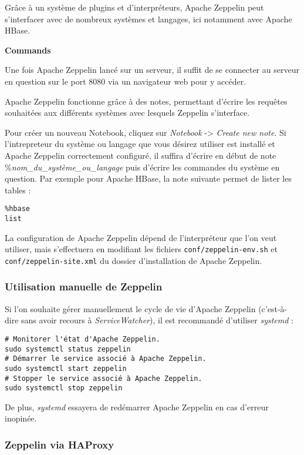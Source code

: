 \documentclass[a4paper,oneside,12pt]{article}
\begin{document}
Grâce à un système de plugins et d'interpréteurs, Apache Zeppelin peut 
s'interfacer avec de nombreux systèmes et langages, ici notamment avec 
Apache HBase.

\textbf{Commands}

Une fois Apache Zeppelin lancé sur un serveur, il suffit de se connecter 
au serveur en question sur le port 8080 via un navigateur web pour y accéder.

Apache Zeppelin fonctionne grâce à des notes, permettant d'écrire les 
requêtes souhaitées aux différents systèmes avec lesquels Zeppelin
s'interface.

Pour créer un nouveau Notebook, cliquez sur \textit{Notebook} -> \textit{Create new note}.
Si l'intrepreteur du système ou langage que vous désirez utiliser est installé
et Apache Zeppelin correctement configuré, il suffira d'écrire en début de note
\%\textit{nom\_du\_système\_ou\_langage} puis d'écrire les commandes du système en question.
Par exemple pour Apache HBase, la note suivante permet de lister les tables :  
\begin{verbatim}
%hbase  
list
\end{verbatim}

La configuration de Apache Zeppelin dépend de l'interpréteur que l'on veut utiliser,
mais s'effectuera en modifiant les fichiers \verb!conf/zeppelin-env.sh! et \verb!conf/zeppelin-site.xml!
du dossier d'installation de Apache Zeppelin.

\subsubsection{Utilisation manuelle de Zeppelin}

Si l'on souhaite gérer manuellement le cycle de vie d'Apache Zeppelin 
(c'est-à-dire sans avoir recours à \textit{ServiceWatcher}), il est 
recommandé d'utiliser \textit{systemd} :

\begin{verbatim}
# Monitorer l'état d'Apache Zeppelin.
sudo systemctl status zeppelin
# Démarrer le service associé à Apache Zeppelin.
sudo systemctl start zeppelin
# Stopper le service associé à Apache Zeppelin.
sudo systemctl stop zeppelin
\end{verbatim}

De plus, \textit{systemd} essayera de redémarrer Apache Zeppelin en cas d'erreur
inopinée.

\subsubsection{Zeppelin via HAProxy}
\end{document}
